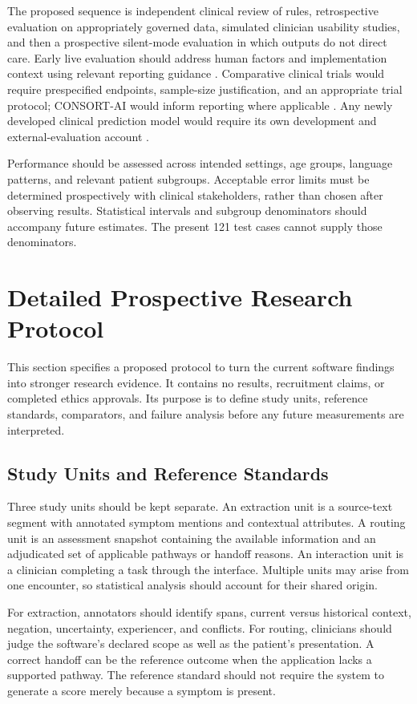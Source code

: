 \documentclass[conference]{IEEEtran}
\begin{document}
The proposed sequence is independent clinical review of rules, retrospective evaluation on appropriately governed data, simulated clinician usability studies, and then a prospective silent-mode evaluation in which outputs do not direct care. Early live evaluation should address human factors and implementation context using relevant reporting guidance \cite{decide}. Comparative clinical trials would require prespecified endpoints, sample-size justification, and an appropriate trial protocol; CONSORT-AI would inform reporting where applicable \cite{consort}. Any newly developed clinical prediction model would require its own development and external-evaluation account \cite{tripod}.

Performance should be assessed across intended settings, age groups, language patterns, and relevant patient subgroups. Acceptable error limits must be determined prospectively with clinical stakeholders, rather than chosen after observing results. Statistical intervals and subgroup denominators should accompany future estimates. The present 121 test cases cannot supply those denominators.

\section{Detailed Prospective Research Protocol}
This section specifies a proposed protocol to turn the current software findings into stronger research evidence. It contains no results, recruitment claims, or completed ethics approvals. Its purpose is to define study units, reference standards, comparators, and failure analysis before any future measurements are interpreted.

\subsection{Study Units and Reference Standards}
Three study units should be kept separate. An extraction unit is a source-text segment with annotated symptom mentions and contextual attributes. A routing unit is an assessment snapshot containing the available information and an adjudicated set of applicable pathways or handoff reasons. An interaction unit is a clinician completing a task through the interface. Multiple units may arise from one encounter, so statistical analysis should account for their shared origin.

For extraction, annotators should identify spans, current versus historical context, negation, uncertainty, experiencer, and conflicts. For routing, clinicians should judge the software's declared scope as well as the patient's presentation. A correct handoff can be the reference outcome when the application lacks a supported pathway. The reference standard should not require the system to generate a score merely because a symptom is present.
\end{document}
